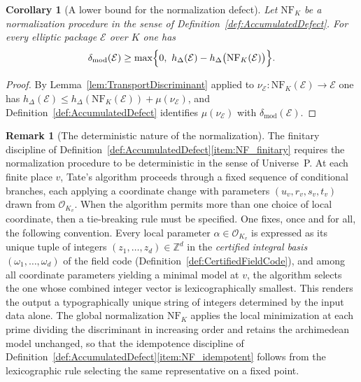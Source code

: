 \documentclass[10pt, reqno]{amsart}
\theoremstyle{plain}
\newtheorem{corollary}[theorem]{Corollary}
\theoremstyle{definition}
\newtheorem{remark}[theorem]{Remark}
\theoremstyle{plain}
\newcommand{\Z}{\mathbb{Z}}
\newcommand{\defect}{\delta_{\mathrm{mod}}}
\begin{document}
\begin{corollary}[A lower bound for the normalization defect]\label{cor:DefectLowerBoundNormalization}
Let $\mathrm{NF}_K$ be a normalization procedure in the sense of Definition~\ref{def:AccumulatedDefect}. For every elliptic package $\mathcal{E}$ over $K$ one has
\[
\defect(\mathcal{E})
\ge
\max\Bigl\{0,\ h_\Delta(\mathcal{E}) - h_\Delta\bigl(\mathrm{NF}_K(\mathcal{E})\bigr)\Bigr\}.
\]
\end{corollary}

\begin{proof}
By Lemma~\ref{lem:TransportDiscriminant} applied to $\nu_{\mathcal{E}} \colon \mathrm{NF}_K(\mathcal{E}) \to \mathcal{E}$ one has $h_\Delta(\mathcal{E}) \le h_\Delta(\mathrm{NF}_K(\mathcal{E})) + \mu(\nu_{\mathcal{E}})$, and Definition~\ref{def:AccumulatedDefect} identifies $\mu(\nu_{\mathcal{E}})$ with $\defect(\mathcal{E})$.
\end{proof}

\begin{remark}[The deterministic nature of the normalization]\label{rem:DeterministicNormalizationDiscipline}
The finitary discipline of Definition~\ref{def:AccumulatedDefect}\textup{\ref{item:NF_finitary}} requires the normalization procedure to be deterministic in the sense of Universe~P. At each finite place $v$, Tate's algorithm proceeds through a fixed sequence of conditional branches, each applying a coordinate change with parameters $(u_v,r_v,s_v,t_v)$ drawn from $\mathcal{O}_{K_v}$. When the algorithm permits more than one choice of local coordinate, then a tie-breaking rule must be specified. One fixes, once and for all, the following convention. Every local parameter $\alpha \in \mathcal{O}_{K_v}$ is expressed as its unique tuple of integers $(z_1, \dots, z_d) \in \Z^d$ in the \textit{certified integral basis} $(\omega_1, \dots, \omega_d)$ of the field code (Definition~\ref{def:CertifiedFieldCode}), and among all coordinate parameters yielding a minimal model at $v$, the algorithm selects the one whose combined integer vector is lexicographically smallest. This renders the output a typographically unique string of integers determined by the input data alone. The global normalization $\mathrm{NF}_K$ applies the local minimization at each prime dividing the discriminant in increasing order and retains the archimedean model unchanged, so that the idempotence discipline of Definition~\ref{def:AccumulatedDefect}\textup{\ref{item:NF_idempotent}} follows from the lexicographic rule selecting the same representative on a fixed point.
\end{remark}
\end{document}
